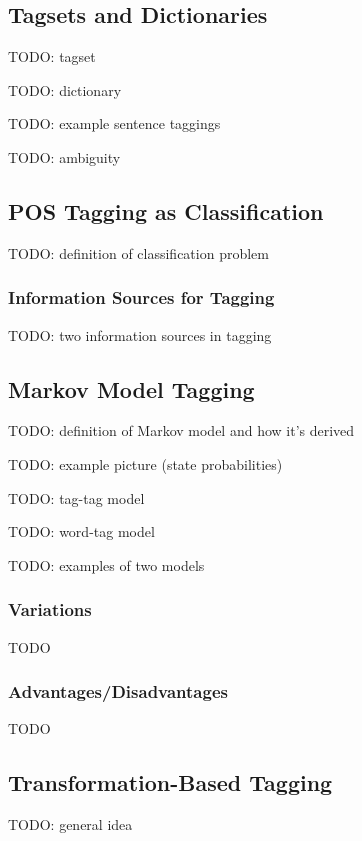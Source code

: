 \documentclass{article}
\begin{document}
\subsection{Tagsets and Dictionaries}

TODO: tagset

TODO: dictionary

TODO: example sentence taggings

TODO: ambiguity

\subsection{POS Tagging as Classification}

TODO: definition of classification problem

\subsubsection{Information Sources for Tagging}

TODO: two information sources in tagging

\subsection{Markov Model Tagging}

TODO: definition of Markov model and how it's derived

TODO: example picture (state probabilities)

TODO: tag-tag model

TODO: word-tag model

TODO: examples of two models

\subsubsection{Variations}

TODO

\subsubsection{Advantages/Disadvantages}

TODO

\subsection{Transformation-Based Tagging}

TODO: general idea
\end{document}
